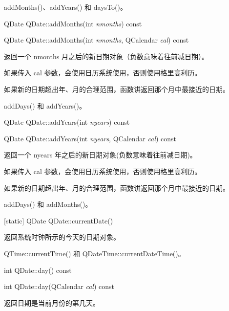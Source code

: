 \begin{seeAlso}
addMonths()、addYears() 和 daysTo()。
\end{seeAlso}

\splitLine

QDate QDate::addMonths(int \emph{nmonths}) const

QDate QDate::addMonths(int \emph{nmonths}, QCalendar \emph{cal}) const

返回一个 nmonths 月之后的新日期对象（负数意味着往前减日期）。

如果传入 cal 参数，会使用日历系统使用，否则使用格里高利历。


\begin{notice}
如果新的日期超出年、月的合理范围，函数讲返回那个月中最接近的日期。
\end{notice}

\begin{seeAlso}
addDays() 和 addYears()。
\end{seeAlso}

\splitLine

QDate QDate::addYears(int \emph{nyears}) const

QDate QDate::addYears(int \emph{nyears}, QCalendar \emph{cal}) const

返回一个 nyears 年之后的新日期对象(负数意味着往前减日期)。

如果传入 cal 参数，会使用日历系统使用，否则使用格里高利历。



\begin{notice}
如果新的日期超出年、月的合理范围，函数讲返回那个月中最接近的日期。
\end{notice}

\begin{seeAlso}
addDays() 和 addMonths()。
\end{seeAlso}


\splitLine

[static] QDate QDate::currentDate()

返回系统时钟所示的今天的日期对象。



\begin{seeAlso}
QTime::currentTime() 和 QDateTime::currentDateTime()。
\end{seeAlso}

\splitLine

int QDate::day() const

int QDate::day(QCalendar \emph{cal}) const

返回日期是当前月份的第几天。

